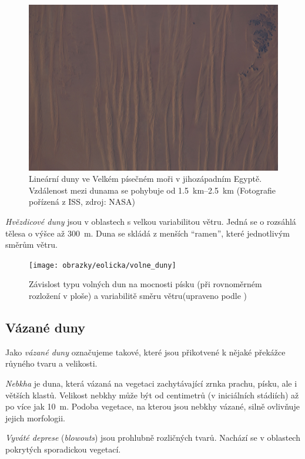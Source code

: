 \begin{figure}
	\centering
	\includegraphics[width=1\linewidth]{obrazky/eolicka/linearniduny}
	\caption{Lineární duny ve Velkém písečném moři v jihozápadním Egyptě. Vzdálenost mezi dunama se pohybuje od \SIrange{1,5}{2,5}{\kilo\metre} (Fotografie pořízená z ISS, zdroj: NASA)}
	\label{fig:linearniduny}
\end{figure}


\emph{Hvězdicové duny} jsou v oblastech s velkou variabilitou větru. Jedná se o rozsáhlá tělesa o výšce až \SI{300}{\metre}. Duna se skládá z menších \enquote{ramen}, které jednotlivým směrům větru.

\begin{figure}
	\centering
	\texttt{[image: obrazky/eolicka/volne\_duny]}
	\caption{Závislost typu volných dun na mocnosti písku (při rovnoměrném rozložení v ploše) a variabilitě směru větru(upraveno podle \textcite{wassonFactorsDeterminingDesert1983})}
	\label{fig:volneduny}
\end{figure}

\subsection{Vázané duny}
Jako \emph{vázané duny} označujeme takové, které jsou přikotvené k nějaké překážce růyného tvaru a velikosti.

\emph{Nebkha} je duna, která vázaná na vegetaci zachytávající zrnka prachu, písku, ale i větších klastů. Velikost nebkhy může být od centimetrů (v iniciálních stádiích) až po více jak \SI{10}{\metre}. Podoba vegetace, na kterou jsou nebkhy vázané, silně ovlivňuje jejich morfologii.

\emph{Vyváté deprese} (\textit{blowouts}) jsou prohlubně rozličných tvarů. Nachází se v oblastech pokrytých sporadickou vegetací.

